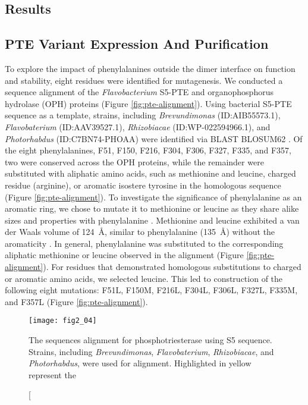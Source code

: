 \begin{refsection}
\section{Results}

\subsection{PTE Variant Expression And Purification}

To explore the impact of phenylalanines outside the dimer interface on
function and stability, eight residues were identified for mutagenesis. We
conducted a sequence alignment of the \emph{Flavobacterium} S5-PTE and
organophosphorus hydrolase (OPH) proteins (Figure \ref{fig:pte-alignment}).
Using bacterial S5-PTE sequence as a template, strains, including
\emph{Brevundimonas} (ID:AIB55573.1), \emph{Flavobaterium} (ID:AAV39527.1),
\emph{Rhizobiacae} (ID:WP-022594966.1), and \emph{Photorhabdus}
(ID:C7BN74-PHOAA) were identified via BLAST BLOSUM62 \cite{Styczynski2008}.  Of
the eight phenylalanines, F51, F150, F216, F304, F306, F327, F335, and F357,
two were conserved across the OPH proteins, while the remainder were
substituted with aliphatic amino acids, such as methionine and leucine, charged
residue (arginine), or aromatic isostere tyrosine in the homologous sequence
(Figure \ref{fig:pte-alignment}). To investigate the significance of
phenylalanine as an aromatic ring, we chose to mutate it to methionine or
leucine as they share alike sizes and properties with phenylalanine
\cite{Richards1974,McDaniel1988}.  Methionine and leucine exhibited a van der
Waals volume of \SI{124}{\angstrom}, similar to phenylalanine
(\SI{135}{\angstrom}) without the aromaticity \cite{Barnes2007,Richards1974}.
In general, phenylalanine was substituted to the corresponding aliphatic
methionine or leucine observed in the alignment (Figure
\ref{fig:pte-alignment}).  For residues that demonstrated homologous
substitutions to charged or aromatic amino acids, we selected leucine. This led
to construction of the following eight mutations: F51L, F150M, F216L, F304L,
F306L, F327L, F335M, and F357L (Figure \ref{fig:pte-alignment}).  
\begin{figure}[htbp] \centering \texttt{[image: fig2\_04]}
    \caption[The sequences alignment for phosphotriesterase using S5
        sequence. Strains, including \emph{Brevundimonas},
        \emph{Flavobaterium}, \emph{Rhizobiacae}, and \emph{Photorhabdus},
        were used for alignment. Highlighted in yellow represent the

\end{figure}
\end{refsection}
